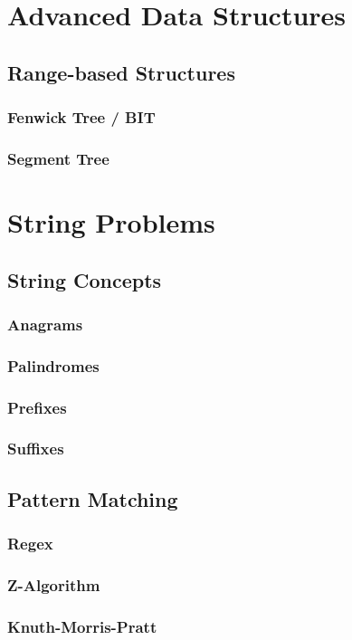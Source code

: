 \documentclass[12pt]{article}
\begin{document}
\section{Advanced Data Structures}
\subsection{Range-based Structures}
\subsubsection{Fenwick Tree / BIT}
\subsubsection{Segment Tree}

\section{String Problems}
\subsection{String Concepts}
\subsubsection{Anagrams}
\subsubsection{Palindromes}
\subsubsection{Prefixes}
\subsubsection{Suffixes}
\subsection{Pattern Matching}
\subsubsection{Regex}
\subsubsection{Z-Algorithm}
\subsubsection{Knuth-Morris-Pratt}
\end{document}
